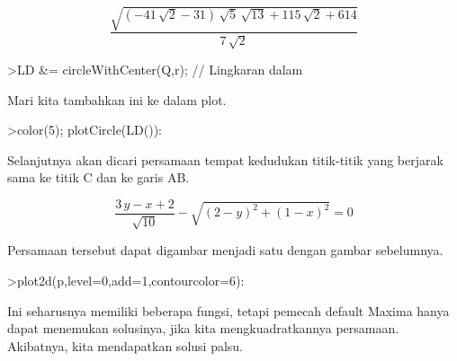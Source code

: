 \documentclass[12pt,arial,letterpaper]{book}
\begin{document}
\begin{eulercomment}
\begin{eulercomment}
\begin{eulercomment}
\begin{eulercomment}
\begin{eulercomment}
\begin{eulercomment}
\begin{eulercomment}
\begin{eulercomment}
\begin{eulercomment}
\begin{eulercomment}
\begin{eulercomment}
\begin{eulercomment}
\begin{eulercomment}
\begin{eulercomment}
\begin{eulercomment}
\begin{eulercomment}
\begin{eulercomment}
\begin{eulercomment}
\begin{eulercomment}
\begin{eulercomment}
\begin{eulercomment}
\begin{eulercomment}
\begin{eulercomment}
\begin{eulercomment}
\begin{eulercomment}
\begin{eulercomment}
\begin{eulerprompt}
\end{eulerprompt}
\begin{eulerformula}
\[
\frac{\sqrt{\left(-41\,\sqrt{2}-31\right)\,\sqrt{5}\,\sqrt{13}+115  \,\sqrt{2}+614}}{7\,\sqrt{2}}
\]
\end{eulerformula}
\begin{eulerprompt}
>LD &=  circleWithCenter(Q,r); // Lingkaran dalam
\end{eulerprompt}
\begin{eulercomment}
Mari kita tambahkan ini ke dalam plot.
\end{eulercomment}
\begin{eulerprompt}
>color(5); plotCircle(LD()):
\end{eulerprompt}
\begin{eulercomment}
Selanjutnya akan dicari persamaan tempat kedudukan titik-titik yang
berjarak sama ke titik C dan ke garis AB.
\end{eulercomment}
\begin{eulerformula}
\[
\frac{3\,y-x+2}{\sqrt{10}}-\sqrt{\left(2-y\right)^2+\left(1-x  \right)^2}=0
\]
\end{eulerformula}
\begin{eulercomment}
Persamaan tersebut dapat digambar menjadi satu dengan gambar sebelumnya.
\end{eulercomment}
\begin{eulerprompt}
>plot2d(p,level=0,add=1,contourcolor=6):
\end{eulerprompt}
\begin{eulercomment}
Ini seharusnya memiliki beberapa fungsi, tetapi pemecah default Maxima
hanya dapat menemukan solusinya, jika kita mengkuadratkannya
persamaan.  Akibatnya, kita mendapatkan solusi palsu.
\end{eulercomment}
\begin{eulerprompt}

\end{eulerprompt}
\end{eulercomment}
\end{eulercomment}
\end{eulercomment}
\end{eulercomment}
\end{eulercomment}
\end{eulercomment}
\end{eulercomment}
\end{eulercomment}
\end{eulercomment}
\end{eulercomment}
\end{eulercomment}
\end{eulercomment}
\end{eulercomment}
\end{eulercomment}
\end{eulercomment}
\end{eulercomment}
\end{eulercomment}
\end{eulercomment}
\end{eulercomment}
\end{eulercomment}
\end{eulercomment}
\end{eulercomment}
\end{eulercomment}
\end{eulercomment}
\end{eulercomment}
\end{eulercomment}
\end{document}
